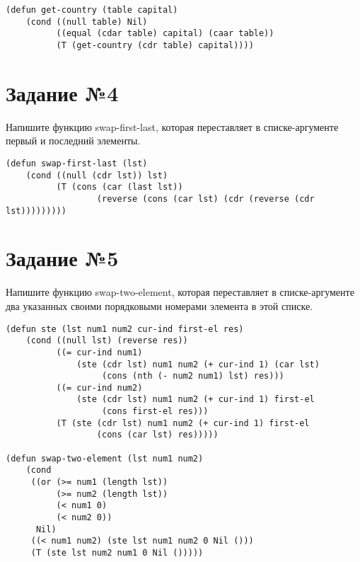 \vspace{4mm}
\begin{minipage}{0.92\linewidth}
\begin{lstlisting}
(defun get-country (table capital)
    (cond ((null table) Nil)
          ((equal (cdar table) capital) (caar table))
          (T (get-country (cdr table) capital))))
\end{lstlisting}
\end{minipage}

\section{Задание №4}

Напишите функцию swap-first-last, которая переставляет в списке-аргументе
первый и последний элементы.

\vspace{4mm}
\begin{minipage}{0.92\linewidth}
\begin{lstlisting}
(defun swap-first-last (lst)
    (cond ((null (cdr lst)) lst)
          (T (cons (car (last lst))
                  (reverse (cons (car lst) (cdr (reverse (cdr lst)))))))))
\end{lstlisting}
\end{minipage}

\section{Задание №5}

Напишите функцию swap-two-element, которая переставляет в списке-аргументе
два указанных своими порядковыми номерами элемента в этой списке.

\vspace{4mm}
\begin{minipage}{0.92\linewidth}
\begin{lstlisting}
(defun ste (lst num1 num2 cur-ind first-el res)
    (cond ((null lst) (reverse res))
          ((= cur-ind num1)
              (ste (cdr lst) num1 num2 (+ cur-ind 1) (car lst)
                   (cons (nth (- num2 num1) lst) res)))
          ((= cur-ind num2)
              (ste (cdr lst) num1 num2 (+ cur-ind 1) first-el
                   (cons first-el res)))
          (T (ste (cdr lst) num1 num2 (+ cur-ind 1) first-el
                  (cons (car lst) res)))))

(defun swap-two-element (lst num1 num2)
    (cond
     ((or (>= num1 (length lst))
          (>= num2 (length lst))
          (< num1 0)
          (< num2 0))
      Nil)
     ((< num1 num2) (ste lst num1 num2 0 Nil ()))
     (T (ste lst num2 num1 0 Nil ()))))
\end{lstlisting}
\end{minipage}


